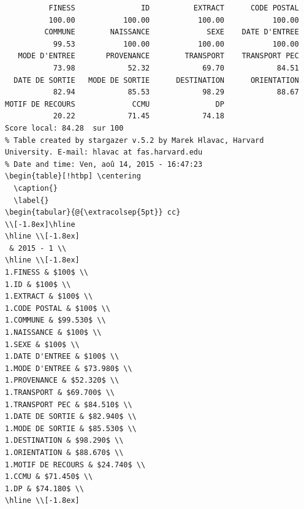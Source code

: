 \documentclass[]{article}
\begin{document}
\begin{verbatim}
          FINESS               ID          EXTRACT      CODE POSTAL 
          100.00           100.00           100.00           100.00 
         COMMUNE        NAISSANCE             SEXE    DATE D'ENTREE 
           99.53           100.00           100.00           100.00 
   MODE D'ENTREE       PROVENANCE        TRANSPORT    TRANSPORT PEC 
           73.98            52.32            69.70            84.51 
  DATE DE SORTIE   MODE DE SORTIE      DESTINATION      ORIENTATION 
           82.94            85.53            98.29            88.67 
MOTIF DE RECOURS             CCMU               DP 
           20.22            71.45            74.18 
Score local: 84.28  sur 100
% Table created by stargazer v.5.2 by Marek Hlavac, Harvard University. E-mail: hlavac at fas.harvard.edu
% Date and time: Ven, aoû 14, 2015 - 16:47:23
\begin{table}[!htbp] \centering 
  \caption{} 
  \label{} 
\begin{tabular}{@{\extracolsep{5pt}} cc} 
\\[-1.8ex]\hline 
\hline \\[-1.8ex] 
 & 2015 - 1 \\ 
\hline \\[-1.8ex] 
1.FINESS & $100$ \\ 
1.ID & $100$ \\ 
1.EXTRACT & $100$ \\ 
1.CODE POSTAL & $100$ \\ 
1.COMMUNE & $99.530$ \\ 
1.NAISSANCE & $100$ \\ 
1.SEXE & $100$ \\ 
1.DATE D'ENTREE & $100$ \\ 
1.MODE D'ENTREE & $73.980$ \\ 
1.PROVENANCE & $52.320$ \\ 
1.TRANSPORT & $69.700$ \\ 
1.TRANSPORT PEC & $84.510$ \\ 
1.DATE DE SORTIE & $82.940$ \\ 
1.MODE DE SORTIE & $85.530$ \\ 
1.DESTINATION & $98.290$ \\ 
1.ORIENTATION & $88.670$ \\ 
1.MOTIF DE RECOURS & $24.740$ \\ 
1.CCMU & $71.450$ \\ 
1.DP & $74.180$ \\ 
\hline \\[-1.8ex] 

\end{verbatim}
\end{document}
